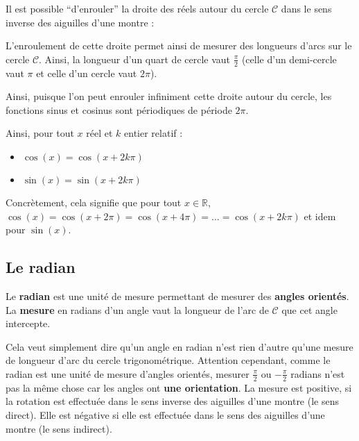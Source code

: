 	Il est possible ``d'enrouler'' la droite des réels autour du cercle $\mathcal{C}$ dans le sens inverse des aiguilles d'une montre :

	\begin{tip}
		L'enroulement de cette droite permet ainsi de mesurer des longueurs d'arcs sur le cercle $\mathcal{C}$. Ainsi, la longueur d'un quart de cercle vaut $\displaystyle{\frac{\pi}{2}}$ (celle d'un demi-cercle vaut $\pi$ et celle d'un cercle vaut $2\pi$).
	\end{tip}

	Ainsi, puisque l'on peut enrouler infiniment cette droite autour du cercle, les fonctions sinus et cosinus sont périodiques de période $2\pi$.

	\begin{formula}[Périodicité]
		Ainsi, pour tout $x$ réel et $k$ entier relatif :
		\begin{itemize}
			\item $\cos(x) = \cos(x + 2k\pi)$
			\item $\sin(x) = \sin(x + 2k\pi)$
		\end{itemize}
	\end{formula}

	\begin{tip}
		Concrètement, cela signifie que pour tout $x \in \mathbb{R}$, $\cos(x) = \cos(x + 2\pi) = \cos(x + 4\pi) = \dots = \cos(x + 2k\pi)$ et idem pour $\sin(x)$.
	\end{tip}

	\subsection{Le radian}

	\begin{formula}[Définition]
		Le \textbf{radian} est une unité de mesure permettant de mesurer des \textbf{angles orientés}. La \textbf{mesure} en radians d'un angle vaut la longueur de l'arc de $\mathcal{C}$ que cet angle intercepte.
	\end{formula}


	\begin{tip}
		Cela veut simplement dire qu'un angle en radian n'est rien d'autre qu'une mesure de longueur d'arc du cercle trigonométrique.
		\newpar
		Attention cependant, comme le radian est une unité de mesure d'angles orientés, mesurer $\frac{\pi}{2}$ ou $-\frac{\pi}{2}$ radians n'est pas la même chose car les angles ont \textbf{une orientation}.
		\newpar
		La mesure est positive, si la rotation est effectuée dans le sens inverse des aiguilles d'une montre (le sens direct). Elle est négative si elle est effectuée dans le sens des aiguilles d'une montre (le sens indirect).
	\end{tip}

